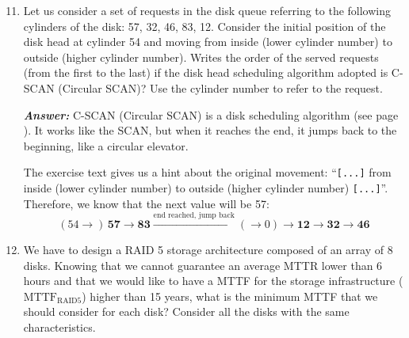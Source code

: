 \begin{enumerate}
    \setcounter{enumi}{10}

    \item Let us consider a set of requests in the disk queue referring to the following cylinders of the disk: 57, 32, 46, 83, 12. Consider the initial position of the disk head at cylinder 54 and moving from inside (lower cylinder number) to outside (higher cylinder number). Writes the order of the served requests (from the ﬁrst to the last) if the disk head scheduling algorithm adopted is C-SCAN (Circular SCAN)? Use the cylinder number to refer to the request.

    \textcolor{Green3}{\textbf{\emph{Answer:}}} C-SCAN (Circular SCAN) is a disk scheduling algorithm (see page \pageref{def: C-SCAN - Elevator Algorithm}). It works like the SCAN, but when it reaches the end, it jumps back to the beginning, like a circular elevator.

    The exercise text gives us a hint about the original movement: ``\texttt{[...]} from inside (lower cylinder number) to outside (higher cylinder number) \texttt{[...]}''. Therefore, we know that the next value will be 57:
    \begin{equation*}
        \left(54 \to\right) \, \mathbf{57} \to \mathbf{83} \xrightarrow{\text{end reached, jump back}} \left(\to 0\right) \to \mathbf{12} \to \mathbf{32} \to \mathbf{46}
    \end{equation*}

    \item We have to design a RAID 5 storage architecture composed of an array of 8 disks. Knowing that we cannot guarantee an average MTTR lower than 6 hours and that we would like to have a MTTF for the storage infrastructure ($\text{MTTF}_{\text{RAID5}}$) higher than 15 years, what is the minimum MTTF that we should consider for each disk? Consider all the disks with the same characteristics.


\end{enumerate}
